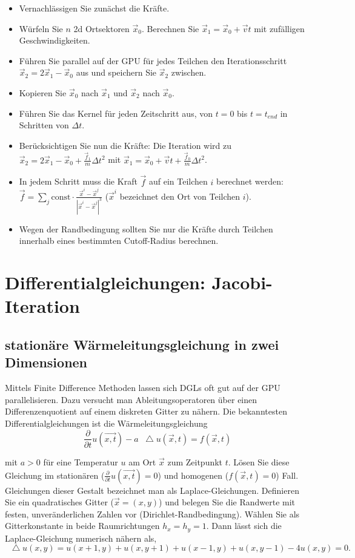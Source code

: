 \documentclass[headsepline=3pt,headinclude=true,12pt,oneside]{scrartcl}
\newcommand*\Laplace{\mathop{}\!\mathbin\bigtriangleup}
\begin{document}
	\begin{itemize}
		\item Vernachlässigen Sie zunächst die Kräfte.
		\item Würfeln Sie $n$ 2d Ortsektoren $\vec{x}_0$. Berechnen Sie $\vec{x}_1 = \vec{x}_0 + \vec{v}t$ mit zufälligen Geschwindigkeiten.
		\item Führen Sie parallel auf der GPU für jedes Teilchen den Iterationsschritt $\vec{x}_2 = 2\vec{x}_1 - \vec{x}_0$ aus und speichern Sie $\vec{x}_2$ zwischen.
		\item Kopieren Sie $\vec{x}_0$ nach $\vec{x}_1$ und $\vec{x}_2$ nach $\vec{x}_0$.
		\item Führen Sie das Kernel für jeden Zeitschritt aus, von $t = 0$ bis $t = t_{end}$ in Schritten von $\Delta t$.
		
		\item Berücksichtigen Sie nun die Kräfte: Die Iteration wird zu $\vec{x}_2 = 2\vec{x}_1 - \vec{x}_0 + \frac{\vec{f}_1}{m}\Delta t^2$ mit $\vec{x}_1 = \vec{x}_0 + \vec{v}t + \frac{\vec{f}_0}{m}\Delta t^2$.
		\item In jedem Schritt muss die Kraft $\vec{f}$ auf ein Teilchen $i$ berechnet werden: $\vec{f} = \sum_j \text{const}\cdot \frac{\vec{x}^i-\vec{x}^j}{|\vec{x}^i-\vec{x}^j|^3}$ ($\vec{x}^i$ bezeichnet den Ort von Teilchen $i$).
		\item Wegen der Randbedingung sollten Sie nur die Kräfte durch Teilchen innerhalb eines bestimmten Cutoff-Radius berechnen.
	\end{itemize}
	
	\section{Differentialgleichungen: Jacobi-Iteration}
	\subsection{stationäre Wärmeleitungsgleichung in zwei Dimensionen}
	Mittels Finite Difference Methoden lassen sich DGLs oft gut auf der GPU parallelisieren. Dazu versucht man Ableitungsoperatoren über einen Differenzenquotient auf einem diskreten Gitter zu nähern. Die bekanntesten Differentialgleichungen ist die Wärmeleitungsgleichung 
	\begin{equation}
		\frac{\partial}{\partial{t}}u(\vec{x,t}) - a\Laplace u(\vec{x},t) = f(\vec{x},t)
	\end{equation}
	
	mit $a > 0$ für eine Temperatur $u$ am Ort $\vec{x}$ zum Zeitpunkt $t$. Lösen Sie diese Gleichung im stationären ($\frac{\partial}{\partial{t}}u(\vec{x,t}) = 0$) und homogenen ($f(\vec{x},t) = 0$) Fall. Gleichungen dieser Gestalt bezeichnet man als Laplace-Gleichungen.
	Definieren Sie ein quadratisches Gitter ($\vec{x}=(x,y)$) und belegen Sie die Randwerte mit festen, unveränderlichen Zahlen vor (Dirichlet-Randbedingung). Wählen Sie als Gitterkonstante in beide Raumrichtungen $h_x=h_y=1$. Dann lässt sich die Laplace-Gleichung numerisch nähern als,
	\begin{equation}\label{heat}
		\Laplace u(x,y) = u(x+1,y) + u(x,y+1) + u(x-1,y) + u(x,y-1) - 4u(x,y) = 0.
	\end{equation}		 
		
\end{document}
